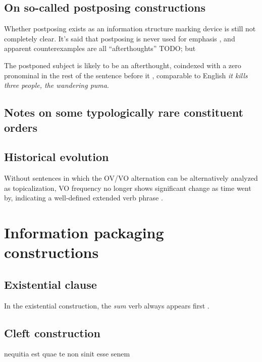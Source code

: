 \documentclass[a4paper, oneside]{report}
\newcommand*{\citesec}[1]{\S~{#1}}
\newcommand*{\citepage}[1]{p.~{#1}}
\newcommand{\form}[1]{\emph{#1}}
\begin{document}
\subsection{On so-called postposing constructions}

Whether postposing exists as an information structure marking device 
is still not completely clear. 
It's said that postposing is never used for emphasis \citep[\citepage{395}]{allen1903allen},
and apparent counterexamples are all ``afterthoughts'' TODO;
but 

The postponed subject is likely to be an afterthought, 
coindexed with a zero pronominal 
in the rest of the sentence before it
\citet[\citepage{87}]{devine2006latin},
comparable to English \form{it kills three people, the wandering puma}.

\subsection{Notes on some typologically rare constituent orders}


\subsection{Historical evolution}\label{sec:constituent-order.history}

Without sentences in which the OV/VO alternation 
can be alternatively analyzed as topicalization,
VO frequency no longer shows significant change as time went by,
indicating a well-defined extended verb phrase \citep[\citesec{1.5}, \citepage{29}]{danckaert2017development}.

\section{Information packaging constructions}

\subsection{Existential clause}\label{sec:clause.exist}

In the existential construction,
the \form{sum} verb always appears first
\citep[\citepage{396}]{allen1903allen}.

\subsection{Cleft construction}

nequitia est quae te non sinit esse senem
\end{document}
